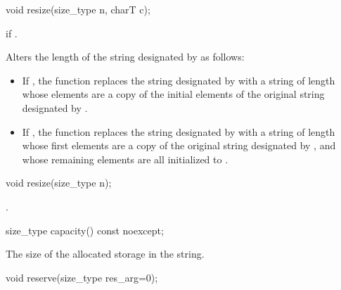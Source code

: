 %
%
\begin{itemdecl}
void resize(size_type n, charT c);
\end{itemdecl}

\begin{itemdescr}
\pnum
\requires
{}

\pnum
\throws
{}
if
.

\pnum
\effects
Alters the length of the string designated by
as follows:

\begin{itemize}
\item
If
,
the function replaces the string designated by
with a string of length  whose elements are a
copy of the initial elements of the original string designated by
.
\item
If
,
the function replaces the string designated by
with a string of length  whose first
elements are a copy of the original string designated by
,
and whose remaining elements are all initialized to .
\end{itemize}
\end{itemdescr}

%
%
\begin{itemdecl}
void resize(size_type n);
\end{itemdecl}

\begin{itemdescr}
\pnum
\effects
{}.
\end{itemdescr}

%
%
\begin{itemdecl}
size_type capacity() const noexcept;
\end{itemdecl}

\begin{itemdescr}
\pnum
\returns
The size of the allocated storage in the string.
\end{itemdescr}

%
%
\begin{itemdecl}
void reserve(size_type res_arg=0);
\end{itemdecl}

